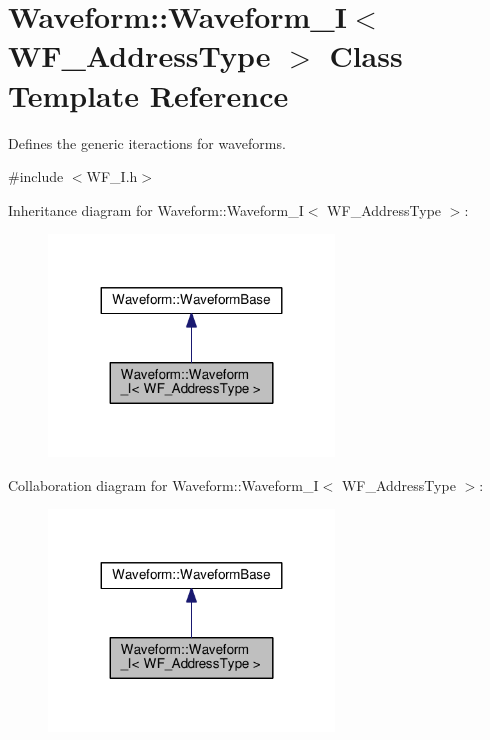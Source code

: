 \hypertarget{class_waveform_1_1_waveform___i}{}\section{Waveform\+:\+:Waveform\+\_\+I$<$ W\+F\+\_\+\+Address\+Type $>$ Class Template Reference}
\label{class_waveform_1_1_waveform___i}


Defines the generic iteractions for waveforms.  




{\ttfamily \#include $<$W\+F\+\_\+\+I.\+h$>$}



Inheritance diagram for Waveform\+:\+:Waveform\+\_\+I$<$ W\+F\+\_\+\+Address\+Type $>$\+:\nopagebreak
\begin{figure}[H]
\begin{center}
\leavevmode
\includegraphics[width=215pt]{class_waveform_1_1_waveform___i__inherit__graph}
\end{center}
\end{figure}


Collaboration diagram for Waveform\+:\+:Waveform\+\_\+I$<$ W\+F\+\_\+\+Address\+Type $>$\+:\nopagebreak
\begin{figure}[H]
\begin{center}
\leavevmode
\includegraphics[width=215pt]{class_waveform_1_1_waveform___i__coll__graph}
\end{center}
\end{figure}
